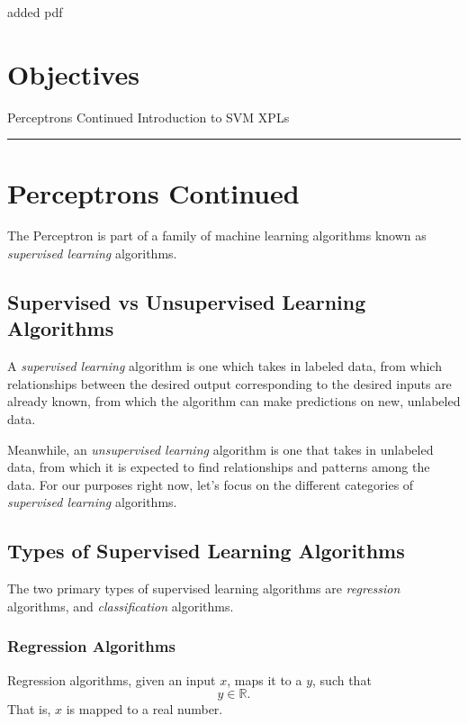 added pdf

\section*{Objectives}
\begin{outline}
    \1 Perceptrons Continued
    \1 Introduction to SVM
    \1 XPLs
\end{outline}

\rule[0.0051in]{\textwidth}{0.00025in}

\section{Perceptrons Continued}
The Perceptron is part of a family of machine learning algorithms known as \textit{supervised learning} algorithms.

\subsection{Supervised vs Unsupervised Learning Algorithms}
A \textit{supervised learning} algorithm is one which takes in labeled data, from which relationships between the desired output corresponding to the desired inputs are already known, from which the algorithm can make predictions on new, unlabeled data.

Meanwhile, an \textit{unsupervised learning} algorithm is one that takes in unlabeled data, from which it is expected to find relationships and patterns among the data. For our purposes right now, let's focus on the different categories of \textit{supervised learning} algorithms.

\subsection{Types of Supervised Learning Algorithms}
The two primary types of supervised learning algorithms are \textit{regression} algorithms, and \textit {classification} algorithms.

\subsubsection{Regression Algorithms}
Regression algorithms, given an input $x$, maps it to a $y$, such that
\[
    y \in \mathbb{R}.
\]
That is, $x$ is mapped to a real number.

